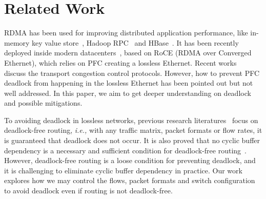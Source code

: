 \secspace
\section{Related Work}
\secspace

 RDMA has been used for improving distributed application performance,
like in-memory key value store~\cite{mitchell13atc, farm, kalia14sigcomm}, 
Hadoop RPC~\cite{hadooprdma} and HBase~\cite{hbaserdma}.
It has been recently deployed inside modern datacenters~\cite{timely,dcqcn,rdmascale}, based on
RoCE (RDMA over Converged Ethernet), which relies on PFC creating a lossless Ethernet.
Recent works~\cite{timely,dcqcn} discuss the transport congestion control protocols. However,
how to prevent PFC deadlock from happening in the lossless Ethernet has been pointed out 
but not well addressed. In this paper, we aim to get deeper understanding on deadlock 
and possible mitigations.

 To avoiding deadlock in lossless networks, previous research 
literatures~\cite{tcpbolt,karol2003prevention} focus on deadlock-free routing, 
{\em i.e.,} with any traffic matrix, packet formats or flow rates, it is guaranteed that deadlock 
does not occur. It is also proved that no cyclic buffer dependency is a necessary and
sufficient condition for deadlock-free routing~\cite{deadlockfree}. However, deadlock-free
routing is a loose condition for preventing deadlock, and it is challenging to eliminate 
cyclic buffer dependency in practice. Our work explores how we may control the flows,
packet formats and switch configuration to avoid deadlock even if routing is not deadlock-free.






